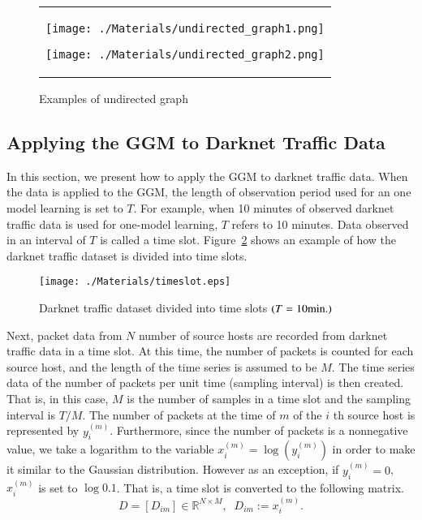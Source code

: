 \documentclass[letterpaper]{sig-alternate-10pt}
\begin{document}
\begin{figure}[htbp]
\begin{tabular}{c}
	\begin{minipage}{0.5\hsize}
		\texttt{[image: ./Materials/undirected\_graph1.png]}
 	\end{minipage}
 	\begin{minipage}{0.5\hsize}
		\texttt{[image: ./Materials/undirected\_graph2.png]}
 	\end{minipage}
\end{tabular}
\caption{Examples of undirected graph}
\label{fig:graph1}
\end{figure}


\subsection{Applying the GGM to Darknet Traffic Data}
In this section, we present how to apply the GGM to darknet traffic data.
When the data is applied to the GGM, the length of observation period used for an one model learning is set to $T$.
For example, when 10 minutes of observed darknet traffic data is used for one-model learning, $T$ refers to 10 minutes.
Data observed in an interval of $T$ is called a time slot.
Figure~\ref{fig:timeslot} shows an example of how the darknet traffic dataset is divided into time slots.

\begin{figure}[htbp]
	\texttt{[image: ./Materials/timeslot.eps]}
	\caption{Darknet traffic dataset divided into time slots $(T={\rm 10 min.})$}
  	\label{fig:timeslot}
\end{figure}

Next, packet data from $N$ number of source hosts are recorded from darknet traffic data in a time slot.
At this time, the number of packets is counted for each source host, and the length of the time series is assumed to be $M$.
The time series data of the number of packets per unit time (sampling interval) is then created.
That is, in this case, $M$ is the number of samples in a time slot and the sampling interval is $T/M$.
The number of packets at the time of $m$ of the $i$ th source host is represented by $y_i^{(m)}$.
Furthermore, since the number of packets is a nonnegative value, we take a logarithm to the variable $x_i^{(m)}=\log(y_i^{(m)})$ in order to make it similar to the Gaussian distribution.
However as an exception, if $y_i^{(m)}=0$, $x_i^{(m)}$ is set to $\log0.1$.
That is, a time slot is converted to the following matrix.
\begin{equation}
\label{eq:d}
D=[D_{im}]\in\mathbb{R}^{N \times M},
\;\;D_{im} := x_i^{(m)}.
\end{equation}
\end{document}
